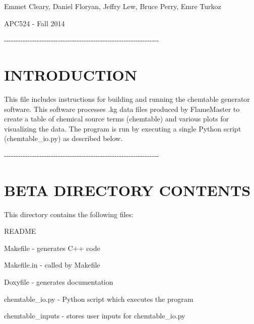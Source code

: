 Emmet Cleary, Daniel Floryan, Jeffry Lew, Bruce Perry, Emre Turkoz

APC524 -\/ Fall 2014

-\/-\/-\/-\/-\/-\/-\/-\/-\/-\/-\/-\/-\/-\/-\/-\/-\/-\/-\/-\/-\/-\/-\/-\/-\/-\/-\/-\/-\/-\/-\/-\/-\/-\/-\/-\/-\/-\/-\/-\/-\/-\/-\/-\/-\/-\/-\/-\/-\/-\/-\/-\/-\/-\/-\/-\/-\/-\/-\/-\/-\/-\/-\/-\/-\/-\/\hypertarget{index__1_}{}\section{INTRODUCTION}\label{index__1_}
This file includes instructions for building and running the chemtable generator software. This software processes .kg data files produced by FlameMaster to create a table of chemical source terms (chemtable) and various plots for visualizing the data. The program is run by executing a single Python script (chemtable\_\-io.py) as described below.

-\/-\/-\/-\/-\/-\/-\/-\/-\/-\/-\/-\/-\/-\/-\/-\/-\/-\/-\/-\/-\/-\/-\/-\/-\/-\/-\/-\/-\/-\/-\/-\/-\/-\/-\/-\/-\/-\/-\/-\/-\/-\/-\/-\/-\/-\/-\/-\/-\/-\/-\/-\/-\/-\/-\/-\/-\/-\/-\/-\/-\/-\/-\/-\/-\/-\/\hypertarget{index__2_}{}\section{BETA DIRECTORY CONTENTS}\label{index__2_}
This directory contains the following files:
\begin{DoxyItemize}
\item README
\item Makefile -\/ generates C++ code
\item Makefile.in -\/ called by Makefile
\item Doxyfile -\/ generates documentation
\item chemtable\_\-io.py -\/ Python script which executes the program
\item chemtable\_\-inputs -\/ stores user inputs for chemtable\_\-io.py
\end{DoxyItemize}


